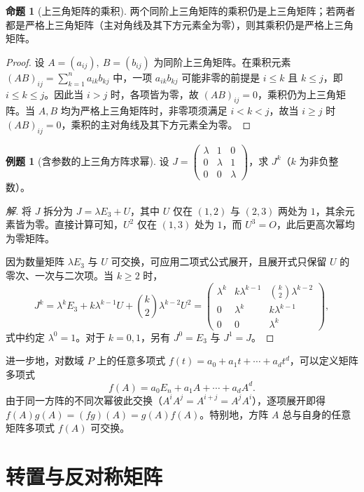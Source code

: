 \documentclass[UTF8,fontset=fandol,a4paper,12pt]{ctexart}
\theoremstyle{definition}
\newtheorem{proposition}[definition]{命题}
\newtheorem{example}[definition]{例题}
\begin{document}
\begin{proposition}[上三角矩阵的乘积]
两个同阶上三角矩阵的乘积仍是上三角矩阵；若两者都是严格上三角矩阵（主对角线及其下方元素全为零），则其乘积仍是严格上三角矩阵。
\end{proposition}
\begin{proof}
设 $A=(a_{ij}),\ B=(b_{ij})$ 为同阶上三角矩阵。在乘积元素 $(AB)_{ij}=\sum_{k=1}^n a_{ik}b_{kj}$ 中，一项 $a_{ik}b_{kj}$ 可能非零的前提是 $i\le k$ 且 $k\le j$，即 $i\le k\le j$。因此当 $i>j$ 时，各项皆为零，故 $(AB)_{ij}=0$，乘积仍为上三角矩阵。当 $A,B$ 均为严格上三角矩阵时，非零项须满足 $i<k<j$，故当 $i\ge j$ 时 $(AB)_{ij}=0$，乘积的主对角线及其下方元素全为零。
\end{proof}

\begin{example}[含参数的上三角方阵求幂]
设 $J=\left(\begin{smallmatrix}\lambda&1&0\\0&\lambda&1\\0&0&\lambda\end{smallmatrix}\right)$，求 $J^k$（$k$ 为非负整数）。
\end{example}
\begin{proof}[解]
将 $J$ 拆分为 $J=\lambda E_3+U$，其中 $U$ 仅在 $(1,2)$ 与 $(2,3)$ 两处为 $1$，其余元素皆为零。直接计算可知，$U^2$ 仅在 $(1,3)$ 处为 $1$，而 $U^3=O$，此后更高次幂均为零矩阵。

因为数量矩阵 $\lambda E_3$ 与 $U$ 可交换，可应用二项式公式展开，且展开式只保留 $U$ 的零次、一次与二次项。当 $k\ge2$ 时，
\[
 J^k=\lambda^k E_3+k\lambda^{k-1}U+\binom{k}{2}\lambda^{k-2}U^2
 =\begin{pmatrix}
 \lambda^k&k\lambda^{k-1}&\binom{k}{2}\lambda^{k-2}\\
 0&\lambda^k&k\lambda^{k-1}\\0&0&\lambda^k
 \end{pmatrix},
\]
式中约定 $\lambda^0=1$。对于 $k=0,1$，另有 $J^0=E_3$ 与 $J^1=J$。
\end{proof}

进一步地，对数域 $P$ 上的任意多项式 $f(t)=a_0+a_1t+\cdots+a_dt^d$，可以定义矩阵多项式
\[
 f(A)=a_0E_n+a_1A+\cdots+a_dA^d.
\]
由于同一方阵的不同次幂彼此交换（$A^iA^j=A^{i+j}=A^jA^i$），逐项展开即得 $f(A)g(A)=(fg)(A)=g(A)f(A)$。特别地，方阵 $A$ 总与自身的任意矩阵多项式 $f(A)$ 可交换。

\section{转置与反对称矩阵}
\end{document}
